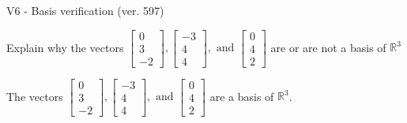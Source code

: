 \begin{exercise}
  \begin{exerciseTitle}V6 - Basis verification (ver. 597)\end{exerciseTitle}
  \begin{exerciseStatement}
    Explain why the vectors \(\left[\begin{array}{r}
0 \\
3 \\
-2
\end{array}\right] , \left[\begin{array}{r}
-3 \\
4 \\
4
\end{array}\right] , \text{ and } \left[\begin{array}{r}
0 \\
4 \\
2
\end{array}\right]\) are or are not a basis of \(\mathbb{R}^3\)	


  \end{exerciseStatement}
  \begin{exerciseAnswer}
   The vectors \(\left[\begin{array}{r}
0 \\
3 \\
-2
\end{array}\right] , \left[\begin{array}{r}
-3 \\
4 \\
4
\end{array}\right] , \text{ and } \left[\begin{array}{r}
0 \\
4 \\
2
\end{array}\right]\) 
  	 are  a basis of \(\mathbb{R}^3\).
  


  \end{exerciseAnswer}
\end{exercise}